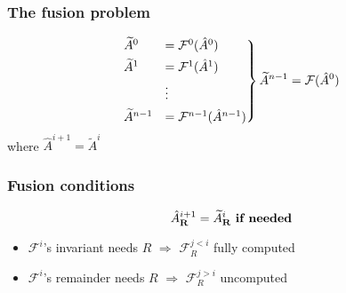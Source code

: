 \documentclass{beamer}
\newcommand*{\opF}{\mathcal{F}}
\begin{document}
\begin{frame}
  \frametitle{The fusion problem}
  \begin{equation*}
    \begin{rcases}
      \widetilde{A}^0 &= \opF^0(\hat{A}^0)\\
      \widetilde{A}^1 &= \opF^1(\hat{A}^1)\\
      &\vdots\\
      \widetilde{A}^{n - 1} &= \opF^{n - 1}(\hat{A}^{n - 1})
    \end{rcases} \widetilde{A}^{n - 1} = \opF(\hat{A}^0)
  \end{equation*}
  where $\hat{A}^{i + 1} = \widetilde{A}^i$
\end{frame}

\begin{frame}
  \frametitle{Fusion conditions}
  \begin{equation*}
    \hat{A}^{i + 1}_{\mathbf{R}} = \widetilde{A}_{\mathbf{R}}^i \text{ \textbf{if needed}}
  \end{equation*}

  \begin{itemize}
  \item $\opF^i$'s invariant needs $R$ $\Rightarrow$ $\opF^{j < i}_R$ fully computed
  \item $\opF^i$'s remainder needs $R$ $\Rightarrow$ $\opF^{j > i}_R$ uncomputed
  \end{itemize}
\end{frame}
\end{document}
